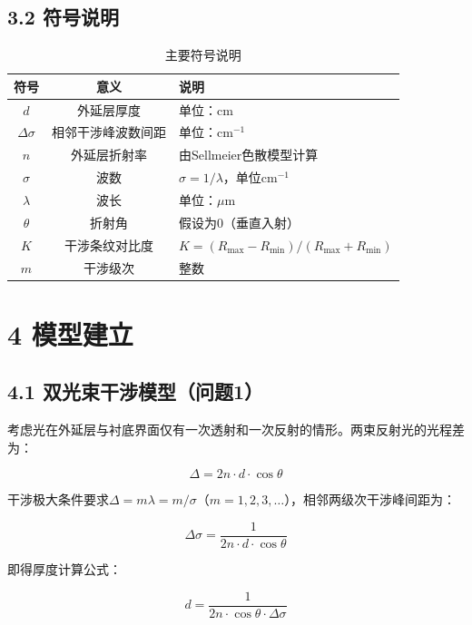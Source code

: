 \documentclass[12pt,a4paper]{article}
\begin{document}
\subsection{3.2 符号说明}
\begin{table}[H]
\centering
\begin{tabular}{ccp{8cm}}
\toprule
符号 & 意义 & 说明 \\
\midrule
$d$ & 外延层厚度 & 单位：cm \\
$\Delta\sigma$ & 相邻干涉峰波数间距 & 单位：cm$^{-1}$ \\
$n$ & 外延层折射率 & 由Sellmeier色散模型计算 \\
$\sigma$ & 波数 & $\sigma=1/\lambda$，单位cm$^{-1}$ \\
$\lambda$ & 波长 & 单位：$\mu$m \\
$\theta$ & 折射角 & 假设为0（垂直入射） \\
$K$ & 干涉条纹对比度 & $K = (R_{\max}-R_{\min})/(R_{\max}+R_{\min})$ \\
$m$ & 干涉级次 & 整数 \\
\bottomrule
\end{tabular}
\caption{主要符号说明}
\end{table}

\section{4 模型建立}

\subsection{4.1 双光束干涉模型（问题1）}
考虑光在外延层与衬底界面仅有一次透射和一次反射的情形。两束反射光的光程差为：

\begin{equation}
\Delta = 2n \cdot d \cdot \cos\theta
\end{equation}

干涉极大条件要求$\Delta = m\lambda = m/\sigma$（$m=1,2,3,\dots$），相邻两级次干涉峰间距为：

\begin{equation}
\boxed{\Delta\sigma = \frac{1}{2n\cdot d\cdot\cos\theta}}
\end{equation}

即得厚度计算公式：

\begin{equation}
\boxed{d = \frac{1}{2n\cdot\cos\theta\cdot\Delta\sigma}}
\end{equation}
\end{document}
